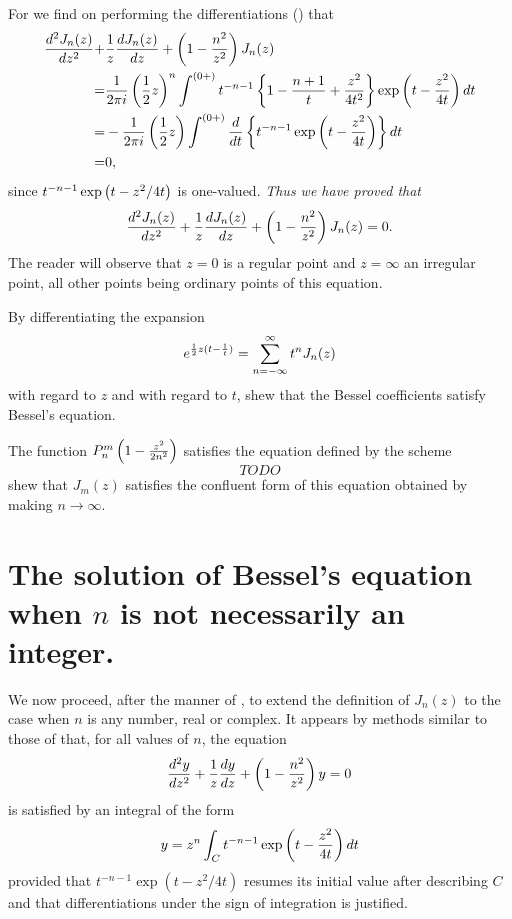 \documentclass{book}
\begin{document}
For we find on performing the differentiations 
() that
\begin{align*}
\frac{d^2 J_n(z)}{dz^2}
+& \frac{1}{z} \frac{d J_n(z)}{dz}
+ \theparen{ 1 - \frac{n^2}{z^2}  } J_n(z)
 \\
%
=& 
\frac{1}{2\pi i} 
\theparen{ \half z  }^n 
\int^{(0+)}
t^{-n-1}
\thebrace{ 1 - \frac{n+1}{t} + \frac{z^2}{4t^2}  }
\exp\theparen{ t - \frac{z^2}{4t}  }
\dmeasure t \\
%
=& 
-\frac{1}{2\pi i}
\theparen{ \half z  }
\int^{(0+)}
\frac{d}{dt} \thebrace{ t^{-n-1} \exp\theparen{ t - \frac{z^2}{4t}  }
}
\dmeasure t \\
%
=& 0,
\end{align*}
since $t^{-n-1} \exp\left(  t - z^2/4t   \right)$ is one-valued.
\emph{Thus we have proved that }
$$
\frac{d^2 J_n(z)}{dz^2}
+ \frac{1}{z} \frac{d J_n(z)}{dz}
+ \left(  1 - \frac{n^2}{z^2}   \right) J_n(z) 
= 0.
$$
The reader will observe that $z=0$ is a regular point and 
$z = \infty$ an irregular point, all other points being ordinary
points of this equation.
%
%
\begin{wandwexample}
  By differentiating the expansion
  $$
  e^{\frac{1}{2} z (t - \frac{1}{t})} = \sum_{n=-\infty}^{\infty} t^n J_n(z)
  $$
  with regard to $z$ and with regard to $t$, shew that the Bessel
  coefficients satisfy Bessel's equation.
\end{wandwexample}
\begin{wandwexample}
  The function $P_n^m\left(  1 - \frac{z^2}{2n^2}   \right)$ satisfies the
  equation defined by the scheme
  $$
  TODO
  $$
  shew that $J_m(z)$ satisfies the confluent form of this equation
  obtained by making $n \rightarrow \infty$.
\end{wandwexample}
\section{The solution of Bessel's equation when $n$ is not necessarily
  an integer.}
We now proceed, after the manner of , to
extend the definition of $J_n(z)$ to the case when $n$ is any number,
real or complex. It appears by methods similar to those of
 that, for all values of $n$, the
equation
$$
\frac{d^2 y}{dz^2}
+ \frac{1}{z} \frac{dy}{dz}
+ \left(  1 - \frac{n^2}{z^2}   \right) y
= 0
$$
is satisfied by an integral of the form
$$
y
=
z^n
\int_C
t^{-n-1}
\exp \left(  t - \frac{z^2}{4t}   \right)
d t
$$
provided that $t^{-n-1}\exp(t - z^2/4t)$ resumes its initial value
after describing $C$ and that differentiations under the sign of
integration is justified.
\end{document}
